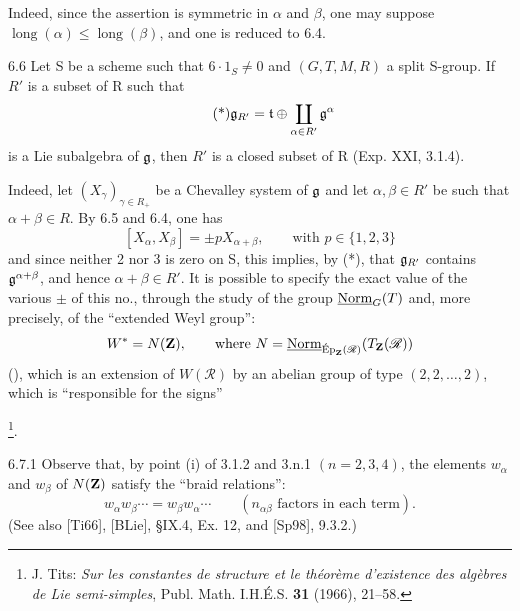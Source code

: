 Indeed, since the assertion is symmetric in $\alpha$ and $\beta$, one may suppose $\operatorname{long}(\alpha)\leq\operatorname{long}(\beta)$, and one is reduced to 6.4.
\begin{corollary}{6.6}\label{XXIII.6.6}
Let S be a scheme such that $6\cdot1_S\ne0$ and $(G,T,M,R)$ a split S-group. If $R'$ is a subset of R such that
\begin{equation}\tag{*}
\mathfrak g_{R'}=\mathfrak t\oplus\coprod_{\alpha\in R'}\mathfrak g^\alpha
\end{equation}
is a Lie subalgebra of $\mathfrak g$, then $R'$ is a closed subset of R (Exp. XXI, 3.1.4).
\end{corollary}
Indeed, let $(X_\gamma)_{\gamma\in R_+}$ be a Chevalley system of $\mathfrak g$ and let $\alpha,\beta\in R'$ be such that $\alpha+\beta\in R$. By 6.5 and 6.4, one has
\[
[X_\alpha,X_\beta]=\pm pX_{\alpha+\beta},\qquad\text{with }p\in\{1,2,3\}
\]
and since neither 2 nor 3 is zero on S, this implies, by (*), that $\mathfrak g_{R'}$ contains $\mathfrak g^{\alpha+\beta}$, and hence $\alpha+\beta\in R'$.
It is possible to specify the exact value of the various $\pm$ of this no., through the study of the group $\underline{\mathrm{Norm}}_G(T)$ and, more precisely, of the ``extended Weyl group'':
\[
W^*=N(\mathbf{Z}),\qquad\text{where }N=\underline{\mathrm{Norm}}_{\mathrm{\acute Ep}_{\mathbf{Z}}(\mathscr R)}(T_{\mathbf{Z}}(\mathscr R))
\]
(), which is an extension of $W(\mathscr R)$ by an abelian group of type $(2,2,\ldots,2)$, which is ``responsible for the signs''\begingroup\renewcommand{\thefootnote}{*}\addtocounter{footnote}{-1}\footnote{\Cf J. Tits: \textit{Sur les constantes de structure et le théorème d'existence des algèbres de Lie semi-simples}, Publ. Math. I.H.É.S. \textbf{31} (1966), 21--58.}\endgroup{}.
\begin{remark}{6.7.1}\label{XXIII.6.7.1}
Observe that, by point (i) of 3.1.2 and 3.n.1 $(n=2,3,4)$, the elements $w_\alpha$ and $w_\beta$ of $N(\mathbf{Z})$ satisfy the ``braid relations'':
\[
w_\alpha w_\beta\cdots=w_\beta w_\alpha\cdots\qquad(n_{\alpha\beta}\text{ factors in each term}).
\]
(See also [Ti66], [BLie], \S IX.4, Ex. 12, and [Sp98], 9.3.2.)
\end{remark}

